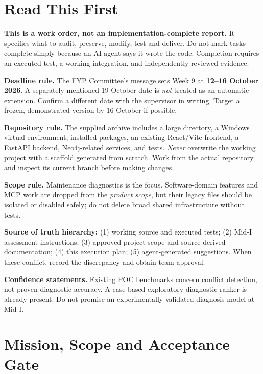 \documentclass[11pt,a4paper,oneside]{report}
\newcommand{\file}[1]{\path{#1}}
\begin{document}
\chapter*{Read This First}
\begin{notice}
\textbf{This is a work order, not an implementation-complete report.} It specifies what to audit, preserve, modify, test and deliver. Do not mark tasks complete simply because an AI agent says it wrote the code. Completion requires an executed test, a working integration, and independently reviewed evidence.
\end{notice}
\textbf{Deadline rule.} The FYP Committee's message sets Week 9 at \textbf{12--16 October 2026}. A separately mentioned 19 October date is \emph{not} treated as an automatic extension. Confirm a different date with the supervisor in writing. Target a frozen, demonstrated version by 16 October if possible.

\textbf{Repository rule.} The supplied archive \file{Halite (FYP).zip} includes a large \file{.git} directory, a Windows virtual environment, installed packages, an existing React/Vite frontend, a FastAPI backend, Neo4j-related services, and tests. \emph{Never} overwrite the working project with a scaffold generated from scratch. Work from the actual repository and inspect its current branch before making changes.

\textbf{Scope rule.} Maintenance diagnostics is the focus. Software-domain features and MCP work are dropped from the \emph{product scope}, but their legacy files should be isolated or disabled safely; do not delete broad shared infrastructure without tests.

\textbf{Source of truth hierarchy:} (1) working source and executed tests; (2) Mid-I assessment instructions; (3) approved project scope and source-derived documentation; (4) this execution plan; (5) agent-generated suggestions. When these conflict, record the discrepancy and obtain team approval.

\textbf{Confidence statements.} Existing POC benchmarks concern conflict detection, not proven diagnostic accuracy. A case-based exploratory diagnostic ranker is already present. Do not promise an experimentally validated diagnosis model at Mid-I.

\vspace{.3cm}
\tableofcontents\clearpage
\clearpage\hypersetup{pageanchor=true}

\chapter{Mission, Scope and Acceptance Gate}
\end{document}
